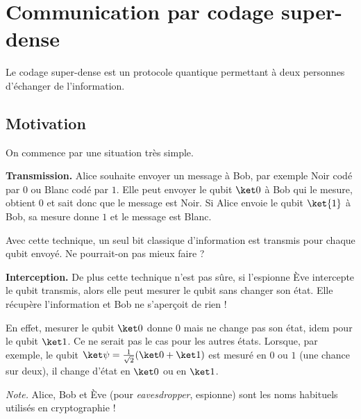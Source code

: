 \documentclass[11pt,class=report,crop=false]{standalone}
\begin{document}
\section{Communication par codage super-dense}

Le codage super-dense est un protocole quantique permettant à deux personnes d'échanger de l'information.

\subsection{Motivation}

On commence par une situation très simple.


\textbf{Transmission.}
Alice souhaite envoyer un message à Bob, par exemple \og{}Noir\fg{} codé par $0$ ou \og{}Blanc\fg{} codé par $1$. Elle peut envoyer le qubit $\ket0$ à Bob qui le mesure, obtient $0$ et sait donc que le message est \og{}Noir\fg{}. Si Alice envoie le qubit $\ket{1}$ à Bob, sa mesure donne $1$ et le message est \og{}Blanc\fg{}.


Avec cette technique, un seul bit classique d'information est transmis pour chaque qubit envoyé. Ne pourrait-on pas mieux faire ?

\bigskip
\textbf{Interception.}
De plus cette technique n'est pas sûre, si l'espionne Ève intercepte le qubit transmis, alors elle peut mesurer le qubit sans changer son état. Elle récupère l'information et Bob ne s'aperçoit de rien !


En effet, mesurer le qubit $\ket0$ donne $0$ mais ne change pas son état, idem pour le qubit $\ket1$. Ce ne serait pas le cas pour les autres états. Lorsque, par exemple, le qubit
$\ket\psi = \frac1{\sqrt2}(\ket0+\ket1)$ est mesuré en $0$ ou $1$ (une chance sur deux), il change d'état en $\ket0$ ou en $\ket1$.





\emph{Note.} Alice, Bob et Ève (pour \emph{eavesdropper}, espionne) sont les noms habituels utilisés en cryptographie !
\end{document}
